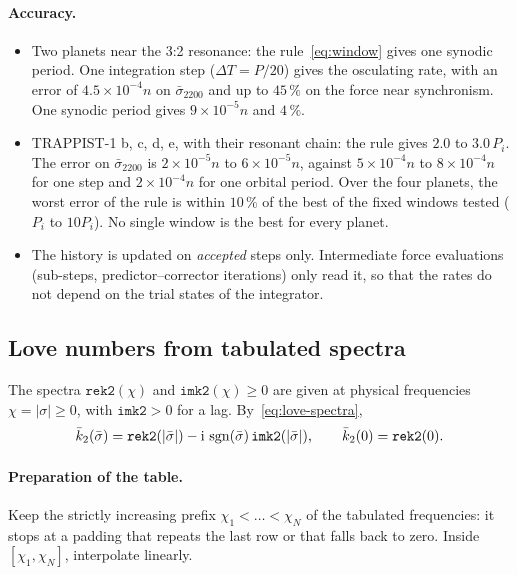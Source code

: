 \paragraph{Accuracy.}
\begin{itemize}
  \item Two planets near the 3:2 resonance: the rule~\eqref{eq:window} gives one synodic period. One integration step ($\Delta T=P/20$) gives the osculating rate, with an error of $4.5\times10^{-4}n$ on $\bar\sigma_{2200}$ and up to $45\,\%$ on the force near synchronism. One synodic period gives $9\times10^{-5}n$ and $4\,\%$.
  \item TRAPPIST-1 b, c, d, e, with their resonant chain: the rule gives $2.0$ to $3.0\,P_i$. The error on $\bar\sigma_{2200}$ is $2\times10^{-5}n$ to $6\times10^{-5}n$, against $5\times10^{-4}n$ to $8\times10^{-4}n$ for one step and $2\times10^{-4}n$ for one orbital period. Over the four planets, the worst error of the rule is within $10\,\%$ of the best of the fixed windows tested ($P_i$ to $10P_i$). No single window is the best for every planet.
  \item The history is updated on \emph{accepted} steps only. Intermediate force evaluations (sub-steps, predictor--corrector iterations) only read it, so that the rates do not depend on the trial states of the integrator.
\end{itemize}

\subsection{Love numbers from tabulated spectra}
The spectra $\texttt{rek2}(\chi)$ and $\texttt{imk2}(\chi)\ge0$ are given at physical frequencies $\chi=|\sigma|\ge0$, with $\texttt{imk2}>0$ for a lag. By~\eqref{eq:love-spectra},
\begin{equation}
  \bar k_2(\bar\sigma)=\texttt{rek2}(|\bar\sigma|)-\mathrm{i}\,\operatorname{sgn}(\bar\sigma)\,\texttt{imk2}(|\bar\sigma|),\qquad \bar k_2(0)=\texttt{rek2}(0). \label{eq:love-impl}
\end{equation}

\paragraph{Preparation of the table.} Keep the strictly increasing prefix $\chi_1<\dots<\chi_N$ of the tabulated frequencies: it stops at a padding that repeats the last row or that falls back to zero. Inside $[\chi_1,\chi_N]$, interpolate linearly.

